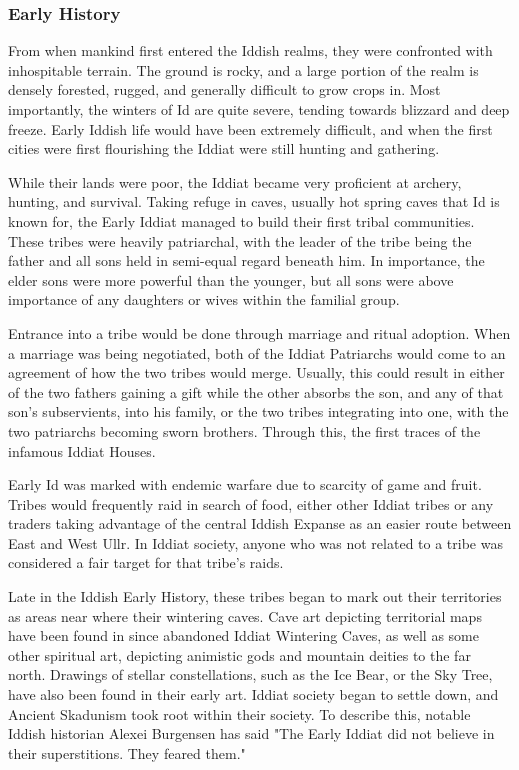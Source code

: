 \begin{multicols}{2}
		\subsubsection{Early History}\par
			From when mankind first entered the Iddish realms, they were confronted with inhospitable terrain. The ground is rocky, and a large portion of the realm is densely forested, rugged, and generally difficult to grow crops in. Most importantly, the winters of Id are quite severe, tending towards blizzard and deep freeze. Early Iddish life would have been extremely difficult, and when the first cities were first flourishing the Iddiat were still hunting and gathering.\par
			While their lands were poor, the Iddiat became very proficient at archery, hunting, and survival. Taking refuge in caves, usually hot spring caves that Id is known for, the Early Iddiat managed to build their first tribal communities. These tribes were heavily patriarchal, with the leader of the tribe being the father and all sons held in semi-equal regard beneath him. In importance, the elder sons were more powerful than the younger, but all sons were above importance of any daughters or wives within the familial group.\par 
			Entrance into a tribe would be done through marriage and ritual adoption. When a marriage was being negotiated, both of the Iddiat Patriarchs would come to an agreement of how the two tribes would merge. Usually, this could result in either of the two fathers gaining a gift while the other absorbs the son, and any of that son's subservients, into his family, or the two tribes integrating into one, with the two patriarchs becoming sworn brothers. Through this, the first traces of the infamous Iddiat Houses.\par
			Early Id was marked with endemic warfare due to scarcity of game and fruit. Tribes would frequently raid in search of food, either other Iddiat tribes or any traders taking advantage of the central Iddish Expanse as an easier route between East and West Ullr. In Iddiat society, anyone who was not related to a tribe was considered a fair target for that tribe's raids.\par 
			Late in the Iddish Early History, these tribes began to mark out their territories as areas near where their wintering caves. Cave art depicting territorial maps have been found in since abandoned Iddiat Wintering Caves, as well as some other spiritual art, depicting animistic gods and mountain deities to the far north. Drawings of stellar constellations, such as the Ice Bear, or the Sky Tree, have also been found in their early art. Iddiat society began to settle down, and Ancient Skadunism took root within their society. To describe this, notable Iddish historian Alexei Burgensen has said "The Early Iddiat did not believe in their superstitions. They feared them."\par

\end{multicols}
